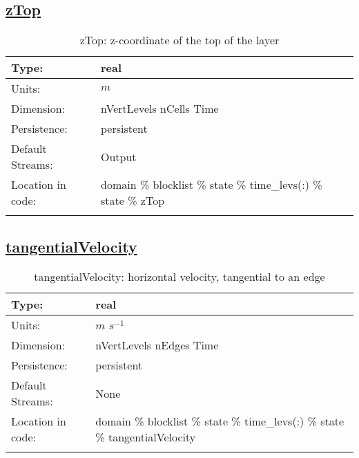 \subsection[zTop]{\hyperref[sec:var_tab_state]{zTop}}
\label{subsec:var_sec_state_zTop}
\begin{center}
\begin{longtable}{| p{2.0in} | p{4.0in} |}
        \hline 
        Type: & real \\
        \hline 
        Units: & $m$ \\
        \hline 
        Dimension: & nVertLevels nCells Time \\
        \hline 
        Persistence: & persistent \\
        \hline 
		 Default Streams: & Output  \\
        \hline 
		 Location in code: & domain \% blocklist \% state \% time\_levs(:) \% state \% zTop \\
		 \hline 
    \caption{zTop: z-coordinate of the top of the layer}
\end{longtable}
\end{center}
\subsection[tangentialVelocity]{\hyperref[sec:var_tab_state]{tangentialVelocity}}
\label{subsec:var_sec_state_tangentialVelocity}
\begin{center}
\begin{longtable}{| p{2.0in} | p{4.0in} |}
        \hline 
        Type: & real \\
        \hline 
        Units: & $m$ $s^{-1}$ \\
        \hline 
        Dimension: & nVertLevels nEdges Time \\
        \hline 
        Persistence: & persistent \\
        \hline 
		 Default Streams: & None \\
        \hline 
		 Location in code: & domain \% blocklist \% state \% time\_levs(:) \% state \% tangentialVelocity \\
		 \hline 
    \caption{tangentialVelocity: horizontal velocity, tangential to an edge}
\end{longtable}
\end{center}
